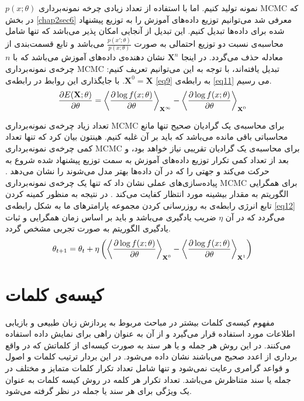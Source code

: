 $p(x;\theta)$
نمونه تولید کنیم. اما با استفاده از تعداد زیادی چرخه نمونه‌برداری
MCMC
که در بخش
\ref{chap2sec6}
معرفی‌ شد می‌توانیم توزیع داده‌های آموزش  را به توزیع پیشنهاد شده برای داده‌ها تبدیل کنیم. این تبدیل از آنجایی امکان پذیر می‌‌باشد که تنها شامل محاسبه‌ی نسبت دو توزیع احتمالی‌ به صورت
$\frac{p(x';\theta)}{p(x;\theta)}$
می‌باشد و تابع قسمت‌بندی از معادله حذف می‌‌گردد. در اینجا
$\textbf{X}^n$
نشان دهنده‌ی داده‌های آموزش می‌‌باشد که با
$n$ 
چرخه‌ی نمونه‌برداری
MCMC
تبدیل یافته‌اند، با توجه به این می‌‌توانیم تعریف کنیم‌:
$\textbf{X}^0 = \textbf{X}$.
با جایگذاری این روابط در رابطه‌ی
\ref{eq9}
به رابطه‌ی
\ref{eq11}
می‌ رسیم.
\begin{align}
\centering
\label{eq11}
	\dfrac{\partial E(\textbf{X};\theta)}{\partial \theta} = \left\langle \dfrac{\partial \log f(x; \theta)}{\partial \theta} \right\rangle_{\textbf{X}^{\infty}} - \left\langle \dfrac{\partial \log f(x;\theta)}{\partial \theta}\right\rangle_{\textbf{X}^0}
\end{align}

تعداد زیاد چرخه‌‌ی نمونه‌برداری
MCMC
برای محاسبه‌ی یک گرادیان صحیح تنها مانع محاسباتی باقی‌ مانده می‌‌باشد که باید بر آن غلبه کنیم. هینتون بیان کرد که تنها تعداد کمی چرخه‌ی نمونه‌برداری
MCMC
برای محاسبه‌ی یک گرادیان تقریبی نیاز خواهد بود، و بعد از تعداد کمی‌ تکرار توزیع داده‌های آموزش به سمت توزیع پیشنهاد شده شروع به حرکت می‌‌کند و جهتی‌ را که در آن داد‌ه‌ها بهتر مدل می‌شوند را نشان می‌‌دهد
\cite{hinton2002training}\cite{carreira2005contrastive}.
پیاده‌سازی‌های عملی‌ نشان داد که تنها یک چرخه‌ی نمونه‌برداری
MCMC
برای همگرایی الگوریتم به مقدار بیشینه مورد انتظار کفایت می‌‌کند
\cite{carreira2005contrastive}.
در نتیجه به منظور کمینه کردن تابع انرژی رابطه‌ی به روز‌رسانی کردن مجموعه پارامتر‌های ما به شکل رابطه‌ی
\ref{eq12}
می‌گردد که در آن
$\eta$
ضریب یادگیری می‌‌باشد و باید بر اساس زمان همگرایی و ثبات یادگیری الگوریتم به صورت تجربی‌ مشخص گردد.
\begin{align}
\centering
\label{eq12}
	\theta_{t+1} = \theta_t + \eta \left(  \left\langle \dfrac{\partial \log f(x; \theta)}{\partial \theta} \right\rangle_{\textbf{X}^0} - \left\langle \dfrac{\partial \log f(x;\theta)}{\partial \theta}\right\rangle_{\textbf{X}^1}  \right) 
\end{align}

\section{کیسه‌ی کلمات}
\label{chap2sec10}
مفهوم کیسه‌ی کلمات
 بیشتر در مباحث مربوط به پردازش زبان طبیعی و بازیابی اطلاعات
مورد استفاده قرار می‌‌گیرد و از آن به عنوان راهی‌ برای نمایش داده استفاده می‌‌کنند. در این روش هر جمله و یا هر سند به صورت کیسه‌ای از کلماتش که در واقع برداری از اعدد صحیح می‌‌باشند نشان داده می‌‌شود. در این بردار ترتیب کلمات و اصول و قواعد گرامری رعایت نمی‌‌شود و تنها شامل تعداد تکرار کلمات متمایز و مختلف در جمله یا سند  متناظرش می‌‌باشد. تعداد تکرار هر کلمه در روش کیسه کلمات به عنوان یک ویژگی‌ برای هر سند یا جمله در نظر گرفته می‌‌شود.

